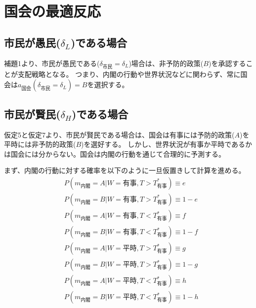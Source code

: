 \documentclass[main.tex]{subfiles}
\begin{document}
\section{国会の最適反応}


\subsection{市民が愚民($\delta_L$)である場合}

補題1より、市民が愚民である($\delta_{市民} = \delta_L$)場合は、非予防的政策($B$)を承認することが支配戦略となる。
つまり、内閣の行動や世界状況などに関わらず、常に国会は$a_{国会}(\delta_{市民}=\delta_L)=B$を選択する。



\subsection{市民が賢民($\delta_H$)である場合}

仮定5と仮定7より、市民が賢民である場合は、国会は有事には予防的政策($A$)を平時には非予防的政策($B$)を選好する。
しかし、世界状況が有事か平時であるかは国会には分からない。国会は内閣の行動を通じて合理的に予測する。

まず、内閣の行動に対する確率を以下のように一旦仮置きして計算を進める。
\begin{align*}
    & P(m_{内閣} = A| W = {有事}, T > T^*_{有事}) \equiv e \\
    & P(m_{内閣} = B| W = {有事}, T > T^*_{有事} ) \equiv 1-e \\
    & P(m_{内閣} = A| W = {有事}, T < T^*_{有事}) \equiv f \\
    & P(m_{内閣} = B| W = {有事}, T < T^*_{有事} ) \equiv 1-f \\
    & P(m_{内閣} = A| W = {平時}, T > T^*_{有事}) \equiv g \\
    & P(m_{内閣} = B| W = {平時}, T > T^*_{有事} ) \equiv 1-g \\
    & P(m_{内閣} = A| W = {平時}, T < T^*_{有事}) \equiv h \\
    & P(m_{内閣} = B| W = {平時}, T < T^*_{有事} ) \equiv 1-h
\end{align*}
\end{document}
